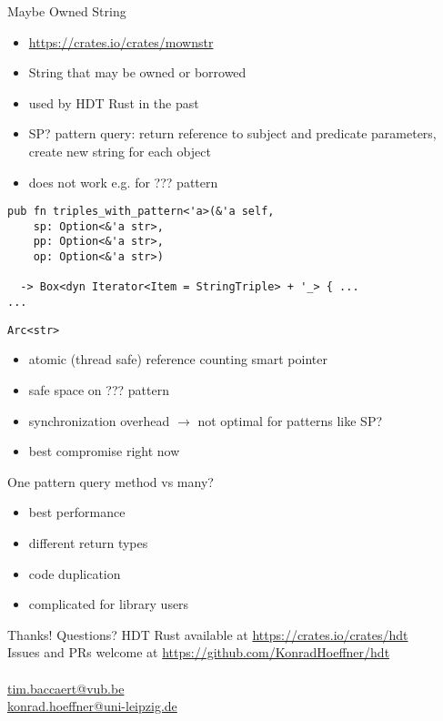 \documentclass[14pt,aspectratio=169]{beamer}
\newcommand\pro{\item[$+$]}
\newcommand\con{\item[$-$]}
\begin{document}
\begin{frame}[fragile]{Maybe Owned String}
\begin{itemize}
\item \url{https://crates.io/crates/mownstr}
\item String that may be owned or borrowed
\item used by HDT Rust in the past
\pro SP? pattern query: return reference to subject and predicate parameters, create new string for each object
\con does not work e.g. for ??? pattern
\end{itemize}
\small
\begin{verbatim}
pub fn triples_with_pattern<'a>(&'a self,
    sp: Option<&'a str>,
    pp: Option<&'a str>,
    op: Option<&'a str>)

  -> Box<dyn Iterator<Item = StringTriple> + '_> { ...
...
\end{verbatim}
\end{frame}

\begin{frame}[fragile]{\texttt{Arc<str>}}
\begin{itemize}
\item atomic (thread safe) reference counting smart pointer
\pro safe space on ??? pattern
\con synchronization overhead $\rightarrow$ not optimal for patterns like SP?
\item best compromise right now
\end{itemize}
\end{frame}

\begin{frame}[fragile]{One pattern query method vs many?}
\begin{itemize}
\pro best performance
\con different return types
\con code duplication
\con complicated for library users
\end{itemize}
\end{frame}

\iffalse
\begin{frame}{Conclusions}
\begin{itemize}
\item Rust great fit for stable and performant Semantic Web tooling
\end{itemize}
\end{frame}
\fi

\begin{frame}[fragile]{Thanks! Questions?}
\centering
HDT Rust available at \url{https://crates.io/crates/hdt}\\
Issues and PRs welcome at \url{https://github.com/KonradHoeffner/hdt}\\
~\\
\url{tim.baccaert@vub.be}\\
\url{konrad.hoeffner@uni-leipzig.de}\\
\end{frame}
\end{document}
